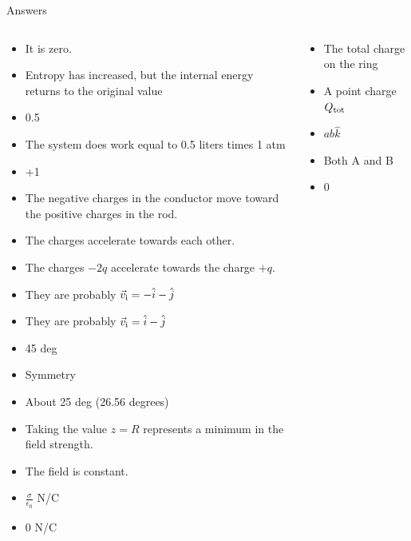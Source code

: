 \documentclass{beamer}
\begin{document}
\begin{frame}{Answers}
\tiny
\begin{columns}[T]
\begin{column}{0.5\textwidth}
\begin{itemize}
\item It is zero.
\item Entropy has increased, but the internal energy returns to the original value
\item 0.5
\item The system does work equal to 0.5 liters times 1 atm
\item +1
\item The negative charges in the conductor move toward the positive charges in the rod.
\item The charges accelerate towards each other.
\item The charges $-2q$ accelerate towards the charge $+q$.
\item They are probably $\vec{v}_{\rm i} = -\hat{i}-\hat{j}$
\item They are probably $\vec{v}_{\rm i} = \hat{i}-\hat{j}$
\item 45 deg
\item Symmetry
\item About 25 deg (26.56 degrees)
\item Taking the value $z = R$ represents a minimum in the field strength.
\item The field is constant.
\item $\frac{\sigma}{\epsilon_0}$ N/C
\item 0 N/C
\end{itemize}
\end{column}
\begin{column}{0.5\textwidth}
\begin{itemize}
\item The total charge on the ring
\item A point charge $Q_{\rm tot}$
\item $ab \hat{k}$
\item Both A and B
\item $0$
\end{itemize}
\end{column}
\end{columns}
\end{frame}
\end{document}
